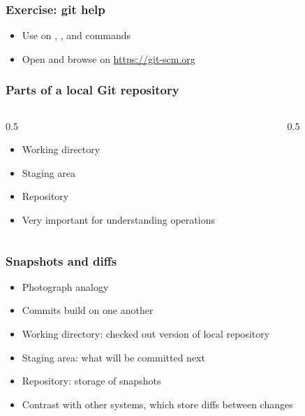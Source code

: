 \begin{frame}
\frametitle{Exercise: git help}
\begin{itemize}
    \item Use  on , ,  and
         commands
    \item Open and browse on \url{https://git-scm.org}
\end{itemize}
\end{frame}

\begin{frame}[fragile]
\frametitle{Parts of a local Git repository}
\begin{columns}[T]
    \begin{column}{0.5\textwidth}
        \begin{itemize}
            \item Working directory
            \item Staging area
            \item Repository
            \item Very important for understanding operations
        \end{itemize}
    \end{column}

    \begin{column}{0.5\textwidth}
        \begin{center}
            \resizebox{!}{0.7\textheight}{%
                
            }
        \end{center}
    \end{column}
\end{columns}
\end{frame}

\begin{frame}
\frametitle{Snapshots and diffs}
\begin{itemize}
    \item Photograph analogy
    \item Commits build on one another
    \item Working directory: checked out version of local repository
    \item Staging area: what will be committed next
    \item Repository: storage of snapshots
    \item Contrast with other systems, which store diffs between changes
\end{itemize}
\end{frame}

